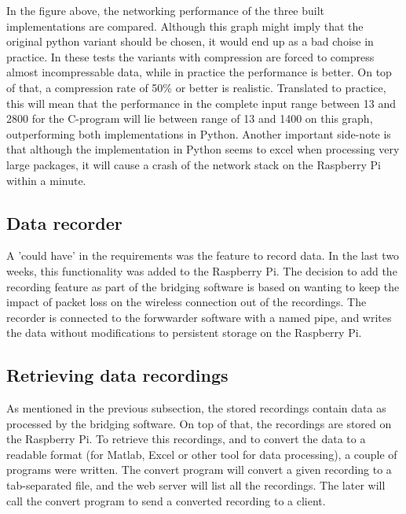 In the figure above, the networking performance of the three built implementations are compared. Although this graph might imply that the original python variant should be chosen, it would end up as a bad choise in practice. In these tests the variants with compression are forced to compress almost incompressable data, while in practice the performance is better. On top of that, a compression rate of 50\% or better is realistic. Translated to practice, this will mean that the performance in the complete input range between 13 and 2800 for the C-program will lie between range of 13 and 1400 on this graph, outperforming both implementations in Python. Another important side-note is that although the implementation in Python seems to excel when processing very large packages, it will cause a crash of the network stack on the Raspberry Pi within a minute.

\subsection{Data recorder}

A 'could have' in the requirements was the feature to record data. In the last two weeks, this functionality was added to the Raspberry Pi. The decision to add the recording feature as part of the bridging software is based on wanting to keep the impact of packet loss on the wireless connection out of the recordings. The recorder is connected to the forwwarder software with a named pipe, and writes the data without modifications to persistent storage on the Raspberry Pi.

\subsection{Retrieving data recordings}

As mentioned in the previous subsection, the stored recordings contain data as processed by the bridging software. On top of that, the recordings are stored on the Raspberry Pi. To retrieve this recordings, and to convert the data to a readable format (for Matlab, Excel or other tool for data processing), a couple of programs were written. The convert program will convert a given recording to a tab-separated file, and the web server will list all the recordings. The later will call the convert program to send a converted recording to a client.